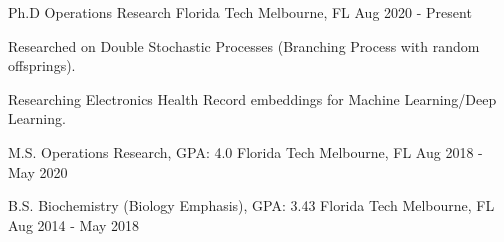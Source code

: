\begin{cventries}

	\cventry
	{Ph.D Operations Research}
	{Florida Tech}
	{Melbourne, FL}
	{Aug 2020 - Present}
	{\begin{cvitems}
			\item {Researched on Double Stochastic Processes (Branching Process with random offsprings).}
			\item {Researching Electronics Health Record embeddings for Machine Learning/Deep Learning.}
		\end{cvitems}
		\vspace{-4mm}}
	
	\cventry
	{M.S. Operations Research, GPA: 4.0}
	{Florida Tech}
	{Melbourne, FL}
	{Aug 2018 - May 2020}
	{}
	\vspace{-6mm}
	
	\cventry
	{B.S. Biochemistry (Biology Emphasis), GPA: 3.43}
	{Florida Tech}
	{Melbourne, FL}
	{Aug 2014 - May 2018}
	{}
	\vspace{-6mm}
	
\end{cventries}

\vspace{-2mm}